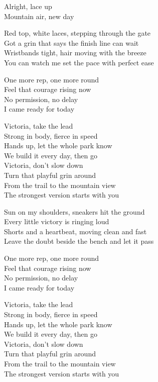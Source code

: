 \begin{lyrics}
Alright, lace up\\
Mountain air, new day

Red top, white laces, stepping through the gate\\
Got a grin that says the finish line can wait\\
Wristbands tight, hair moving with the breeze\\
You can watch me set the pace with perfect ease

One more rep, one more round\\
Feel that courage rising now\\
No permission, no delay\\
I came ready for today

Victoria, take the lead\\
Strong in body, fierce in speed\\
Hands up, let the whole park know\\
We build it every day, then go\\
Victoria, don’t slow down\\
Turn that playful grin around\\
From the trail to the mountain view\\
The strongest version starts with you

Sun on my shoulders, sneakers hit the ground\\
Every little victory is ringing loud\\
Shorts and a heartbeat, moving clean and fast\\
Leave the doubt beside the bench and let it pass

One more rep, one more round\\
Feel that courage rising now\\
No permission, no delay\\
I came ready for today

Victoria, take the lead\\
Strong in body, fierce in speed\\
Hands up, let the whole park know\\
We build it every day, then go\\
Victoria, don’t slow down\\
Turn that playful grin around\\
From the trail to the mountain view\\
The strongest version starts with you


\end{lyrics}

